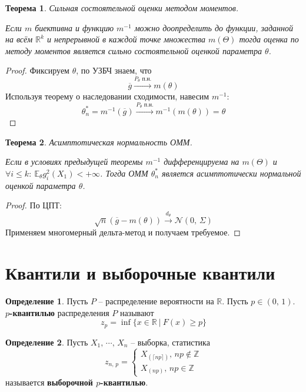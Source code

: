 \documentclass[a4paper,12pt]{article}
\renewcommand{\leq}{\ensuremath{\leqslant}}
\renewcommand{\geq}{\ensuremath{\geqslant}}
\theoremstyle{plain}
\newtheorem{theorem}{Теорема}[section]
\theoremstyle{definition}
\newtheorem{definition}{Определение}[section]
\theoremstyle{remark}
\begin{document}
\begin{theorem}
  Сильная состоятельной оценки методом моментов.

  Если $m$ биективна и функцию $m^{-1}$ можно доопределить до функции, заданной на всём $\mathbb{R}^k$ и непрерывной в каждой точке множества $m(\Theta)$ тогда оценка по методу моментов является сильно состоятельной оценкой параметра $\theta$.
\end{theorem}

\begin{proof}
  Фиксируем $\theta$, по УЗБЧ знаем, что
  \[
    \overline{g} \overset{P_\theta \text{ п.н.}}{\to} m(\theta)
  \]
  Используя теорему о наследовании сходимости, навесим $m^{-1}$:
  \[
    \theta_n^* = m^{-1}(\overline{g}) \overset{P_\theta \text{ п.н.}}{\to} m^{-1}(m(\theta)) = \theta
  \] 
\end{proof}

\begin{theorem}
  Асимптотическая нормальность ОММ.

  Если в условиях предыдущей теоремы $m^{-1}$ дифференцируема на $m(\Theta)$ и $\forall i \leq k :\: \mathbb{E}_\theta g_i^2(X_1) < +\infty$. Тогда ОММ $\theta_n^*$ является асимптотически нормальной оценкой параметра $\theta$.
\end{theorem}

\begin{proof}
  По ЦПТ:
  \[
    \sqrt{n}(\overline{g} - m(\theta)) \overset{d_\theta}{\to} \mathcal{N}(0,\, \Sigma)
  \]
  Применяем многомерный дельта-метод и получаем требуемое.
\end{proof}

\section{Квантили и выборочные квантили}
\begin{definition}
  Пусть $P$ -- распределение вероятности на $\mathbb{R}$. Пусть $p \in (0,\, 1)$. \textbf{$p$-квантилью} распределения $P$ называют 
  \[
    z_p = \inf\{x \in \mathbb{R} \:\vert\: F(x) \geq p\}
  \]
\end{definition}

\begin{definition}
  Пусть $X_1,\,\cdots,\,X_n$ -- выборка, статистика
  \[
    z_{n,\,p} = \begin{cases}
      X_{(\lceil np\rceil)},\, np \not\in \mathbb{Z}\\
      X_{(np)},\, np \in \mathbb{Z}
    \end{cases}
  \]
  называется \textbf{выборочной $p$-квантилью}.
\end{definition}
\end{document}
